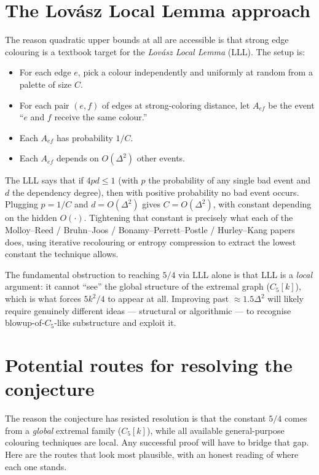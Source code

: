 \documentclass[11pt]{article}
\begin{document}
\section*{The Lov\'asz Local Lemma approach}

The reason quadratic upper bounds at all are accessible is that
strong edge colouring is a textbook target for the
\emph{Lov\'asz Local Lemma} (LLL). The setup is:

\begin{itemize}[leftmargin=*, itemsep=2pt]
  \item For each edge $e$, pick a colour independently and uniformly
        at random from a palette of size $C$.
  \item For each pair $(e, f)$ of edges at strong-coloring distance,
        let $A_{ef}$ be the event ``$e$ and $f$ receive the same
        colour.''
  \item Each $A_{ef}$ has probability $1/C$.
  \item Each $A_{ef}$ depends on $O(\Delta^2)$ other events.
\end{itemize}

The LLL says that if $4 p d \leq 1$ (with $p$ the probability of any
single bad event and $d$ the dependency degree), then with positive
probability no bad event occurs. Plugging $p = 1/C$ and $d =
O(\Delta^2)$ gives $C = O(\Delta^2)$, with constant depending on the
hidden $O(\cdot)$. Tightening that constant is precisely what each
of the Molloy--Reed / Bruhn--Joos / Bonamy--Perrett--Postle /
Hurley--Kang papers does, using iterative recolouring or entropy
compression to extract the lowest constant the technique allows.

The fundamental obstruction to reaching $5/4$ via LLL alone is
that LLL is a \emph{local} argument: it cannot ``see'' the global
structure of the extremal graph ($C_5[k]$), which is what forces
$5k^2/4$ to appear at all. Improving past $\approx 1.5\Delta^2$
will likely require genuinely different ideas --- structural or
algorithmic --- to recognise blowup-of-$C_5$-like substructure
and exploit it.

\section*{Potential routes for resolving the conjecture}

The reason the conjecture has resisted resolution is that the
constant $5/4$ comes from a \emph{global} extremal family
($C_5[k]$), while all available general-purpose colouring techniques
are local. Any successful proof will have to bridge that gap. Here
are the routes that look most plausible, with an honest reading of
where each one stands.
\end{document}
